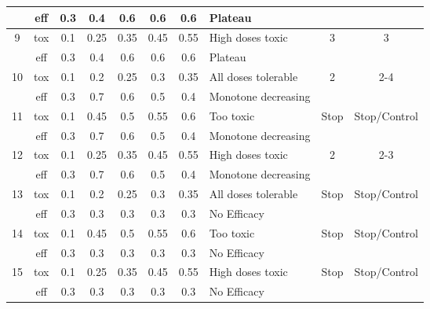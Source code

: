 \begin{table}[h!]
{\begin{tabular}{cc|ccccc|l|cc}
		& eff & 0.3 & 0.4 & 0.6 & 0.6 & 0.6 & Plateau &  &  \\ \hline
		\multirow{2}{*}{9} & tox & 0.1 & 0.25 & 0.35 & 0.45 & 0.55 & High doses toxic & \multirow{2}{*}{3} & \multirow{2}{*}{3} \\
		& eff & 0.3 & 0.4 & 0.6 & 0.6 & 0.6 & Plateau &  &  \\ \hline
		\multirow{2}{*}{10} & tox & 0.1 & 0.2 & 0.25 & 0.3 & 0.35 & All doses tolerable & \multirow{2}{*}{2} & \multirow{2}{*}{2-4} \\
		& eff & 0.3 & 0.7 & 0.6 & 0.5 & 0.4 & Monotone decreasing &  &  \\ \hline
		\multirow{2}{*}{11} & tox & 0.1 & 0.45 & 0.5 & 0.55 & 0.6 & Too toxic & \multirow{2}{*}{Stop} & \multirow{2}{*}{Stop/Control} \\
		& eff & 0.3 & 0.7 & 0.6 & 0.5 & 0.4 & Monotone decreasing &  &  \\ \hline
		\multirow{2}{*}{12} & tox & 0.1 & 0.25 & 0.35 & 0.45 & 0.55 & High doses toxic & \multirow{2}{*}{2} & \multirow{2}{*}{2-3} \\
		& eff & 0.3 & 0.7 & 0.6 & 0.5 & 0.4 & Monotone decreasing &  &  \\ \hline
		\multirow{2}{*}{13} & tox & 0.1 & 0.2 & 0.25 & 0.3 & 0.35 & All doses tolerable & \multirow{2}{*}{Stop} & \multirow{2}{*}{Stop/Control} \\
		& eff & 0.3 & 0.3 & 0.3 & 0.3 & 0.3 & No Efficacy &  &  \\ \hline
		\multirow{2}{*}{14} & tox & 0.1 & 0.45 & 0.5 & 0.55 & 0.6 & Too toxic & \multirow{2}{*}{Stop} & \multirow{2}{*}{Stop/Control} \\
		& eff & 0.3 & 0.3 & 0.3 & 0.3 & 0.3 & No Efficacy &  &  \\ \hline
		\multirow{2}{*}{15} & tox & 0.1 & 0.25 & 0.35 & 0.45 & 0.55 & High doses toxic & \multirow{2}{*}{Stop} & \multirow{2}{*}{Stop/Control} \\
		& eff & 0.3 & 0.3 & 0.3 & 0.3 & 0.3 & No Efficacy &  &  \\ \hline
	\end{tabular}%
}
\end{table}
\newpage

\setlength\LTcapwidth{\textwidth}
\begingroup\fontsize{9}{11}\selectfont

